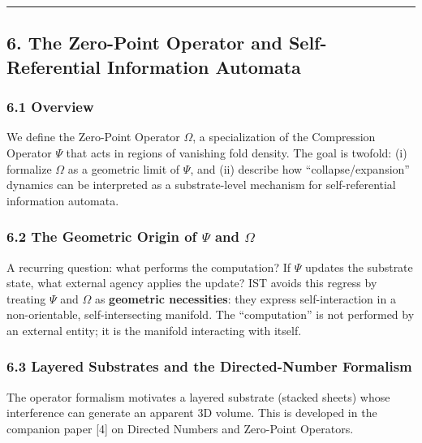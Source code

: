 \documentclass[
]{article}
\begin{document}
\begin{center}\rule{0.5\linewidth}{0.5pt}\end{center}

\subsection{6. The Zero-Point Operator and Self-Referential Information
Automata}\label{the-zero-point-operator-and-self-referential-information-automata}

\subsubsection{6.1 Overview}\label{overview-2}

We define the Zero-Point Operator \(\Omega\), a specialization of the
Compression Operator \(\Psi\) that acts in regions of vanishing fold
density. The goal is twofold: (i) formalize \(\Omega\) as a geometric
limit of \(\Psi\), and (ii) describe how ``collapse/expansion'' dynamics
can be interpreted as a substrate-level mechanism for self-referential
information automata.

\subsubsection{\texorpdfstring{6.2 The Geometric Origin of \(\Psi\) and
\(\Omega\)}{6.2 The Geometric Origin of \textbackslash Psi and \textbackslash Omega}}\label{the-geometric-origin-of-psi-and-omega}

A recurring question: what performs the computation? If \(\Psi\) updates
the substrate state, what external agency applies the update? IST avoids
this regress by treating \(\Psi\) and \(\Omega\) as \textbf{geometric
necessities}: they express self-interaction in a non-orientable,
self-intersecting manifold. The ``computation'' is not performed by an
external entity; it is the manifold interacting with itself.

\subsubsection{6.3 Layered Substrates and the Directed-Number
Formalism}\label{layered-substrates-and-the-directed-number-formalism}

The operator formalism motivates a layered substrate (stacked sheets)
whose interference can generate an apparent 3D volume. This is developed
in the companion paper {[}4{]} on Directed Numbers and Zero-Point
Operators.
\end{document}
